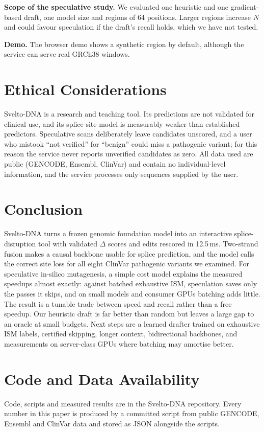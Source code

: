 \documentclass[conference]{IEEEtran}
\begin{document}
\textbf{Scope of the speculative study.} We evaluated one heuristic and one gradient-based draft, one model size and regions of 64 positions. Larger regions increase $N$ and could favour speculation if the draft's recall holds, which we have not tested.

\textbf{Demo.} The browser demo shows a synthetic region by default, although the service can serve real GRCh38 windows.

\section{Ethical Considerations}
Svelto-DNA is a research and teaching tool. Its predictions are not validated for clinical use, and its splice-site model is measurably weaker than established predictors. Speculative scans deliberately leave candidates unscored, and a user who mistook ``not verified'' for ``benign'' could miss a pathogenic variant; for this reason the service never reports unverified candidates as zero. All data used are public (GENCODE, Ensembl, ClinVar) and contain no individual-level information, and the service processes only sequences supplied by the user.

\section{Conclusion}
Svelto-DNA turns a frozen genomic foundation model into an interactive splice-disruption tool with validated $\Delta$ scores and edits rescored in 12.5\,ms. Two-strand fusion makes a causal backbone usable for splice prediction, and the model calls the correct site loss for all eight ClinVar pathogenic variants we examined. For speculative in-silico mutagenesis, a simple cost model explains the measured speedups almost exactly: against batched exhaustive ISM, speculation saves only the passes it skips, and on small models and consumer GPUs batching adds little. The result is a tunable trade between speed and recall rather than a free speedup. Our heuristic draft is far better than random but leaves a large gap to an oracle at small budgets. Next steps are a learned drafter trained on exhaustive ISM labels, certified skipping, longer context, bidirectional backbones, and measurements on server-class GPUs where batching may amortise better.

\section*{Code and Data Availability}
Code, scripts and measured results are in the Svelto-DNA repository. Every number in this paper is produced by a committed script from public GENCODE, Ensembl and ClinVar data and stored as JSON alongside the scripts.



\end{document}
